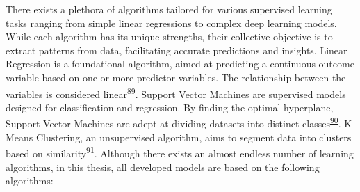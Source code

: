 \documentclass[
  10pt,
]{scrbook}
\begin{document}
There exists a plethora of algorithms tailored for various supervised
learning tasks ranging from simple linear regressions to complex deep
learning models. While each algorithm has its unique strengths, their
collective objective is to extract patterns from data, facilitating
accurate predictions and insights. Linear Regression is a foundational
algorithm, aimed at predicting a continuous outcome variable based on
one or more predictor variables. The relationship between the variables
is considered
linear\textsuperscript{\protect\hyperlink{ref-kutner_2005}{89}}. Support
Vector Machines are supervised models designed for classification and
regression. By finding the optimal hyperplane, Support Vector Machines
are adept at dividing datasets into distinct
classes\textsuperscript{\protect\hyperlink{ref-cortes_1995}{90}}.
K-Means Clustering, an unsupervised algorithm, aims to segment data into
clusters based on
similarity\textsuperscript{\protect\hyperlink{ref-macqueen_1967}{91}}.
Although there exists an almost endless number of learning algorithms,
in this thesis, all developed models are based on the following
algorithms:
\end{document}
